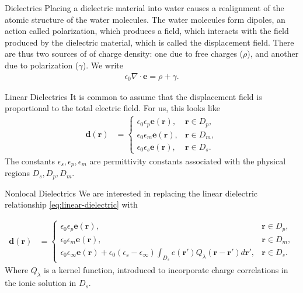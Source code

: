 \documentclass{beamer}
\newcommand{\ei}{\epsilon_\infty}
\newcommand{\es}{\epsilon_s}
\newcommand{\ep}{\epsilon_p}
\newcommand{\emem}{\epsilon_m}
\newcommand{\ez}{\epsilon_0}
\newcommand{\ee}{{\mathbf e}}
\newcommand{\dd}{{\mathbf d}}
\newcommand{\rr}{{\mathbf r}}
\begin{document}
\begin{frame}{Dielectrics}
    Placing a dielectric material into water causes a realignment of the atomic structure of the water molecules. The water molecules form dipoles, an action called polarization, which produces a field, which interacts with the field produced by the dielectric material, which is called the displacement field. There are thus two sources of of charge density: one due to free charges ($\rho$), and another due to polarization ($\gamma$). We write 
    \begin{align}\label{eq:gauss-dielectric}
        \ez \nabla \cdot \ee = \rho + \gamma. 
    \end{align}
\end{frame}
\begin{frame}{Linear Dielectrics}
    It is common to assume that the displacement field is proportional to the total electric field. For us, this looks like 
    \begin{align}
            \dd(\rr) &= \begin{cases}
		\ez \ep \ee(\rr), & \rr \in D_p, \\
		\ez \emem\ee (\rr), & \rr \in D_m, \\
		\ez \es \ee(\rr) , & \rr \in D_s.
	\end{cases} \label{eq:linear-dielectric}
    \end{align}
    The constants $\es, \ep, \emem$ are permittivity constants associated with the physical regions $D_s, D_p, D_m.$
\end{frame}
\begin{frame}{Nonlocal Dielectrics}
    We are interested in replacing the linear dielectric relationship \eqref{eq:linear-dielectric} with 

    \begin{align}
    \dd(\rr) &= \begin{cases}
		\ez \ep \ee(\rr), & \rr \in D_p, \\
		\ez \emem\ee (\rr), & \rr \in D_m, \\
		\ez \ei \ee(\rr) + \ez(\es - \ei) \int_{D_s} e(\rr') Q_\lambda(\rr - \rr') d\rr', & \rr \in D_s.
	\end{cases} \label{eq:dielectric}
\end{align}
Where $Q_\lambda$ is a kernel function, introduced to incorporate charge correlations in the ionic solution in $D_s.$
\end{frame}
\end{document}

